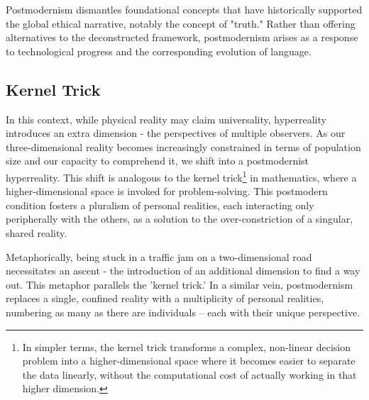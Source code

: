 \documentclass[11pt,a4]{article}
\begin{document}
    Postmodernism dismantles foundational concepts
    that have historically supported
    the global ethical narrative, notably the concept of "truth." Rather than
    offering alternatives to the deconstructed framework, postmodernism arises
    as a response to technological
    progress and the corresponding evolution of language.

    \subsection{Kernel Trick} \label{kerneltrick}
    In this context, while physical reality may claim universality, hyperreality
    introduces an extra dimension - the perspectives of multiple observers.
    As our three-dimensional reality becomes increasingly constrained
    in terms of population size and our capacity to comprehend it,
    we shift into a postmodernist hyperreality. This shift is analogous
    to the kernel trick\footnote{In simpler terms, the kernel trick
    transforms a complex, non-linear decision problem into a
    higher-dimensional space where it becomes easier to separate
    the data linearly, without the computational cost of actually
    working in that higher dimension.
    } in mathematics, where a higher-dimensional space is invoked
    for problem-solving.
    This postmodern condition fosters a pluralism of personal realities,
    each interacting only peripherally with the others, as a solution to
    the over-constriction of a singular, shared reality.

    Metaphorically, being stuck in a traffic jam on a two-dimensional
    road necessitates an ascent - the introduction of an additional
    dimension to find a way out. This metaphor parallels the 'kernel trick.'
    In a similar vein, postmodernism replaces a single, confined reality
    with a multiplicity of personal realities, numbering as many as
    there are individuals – each with their unique perspective.
\end{document}
